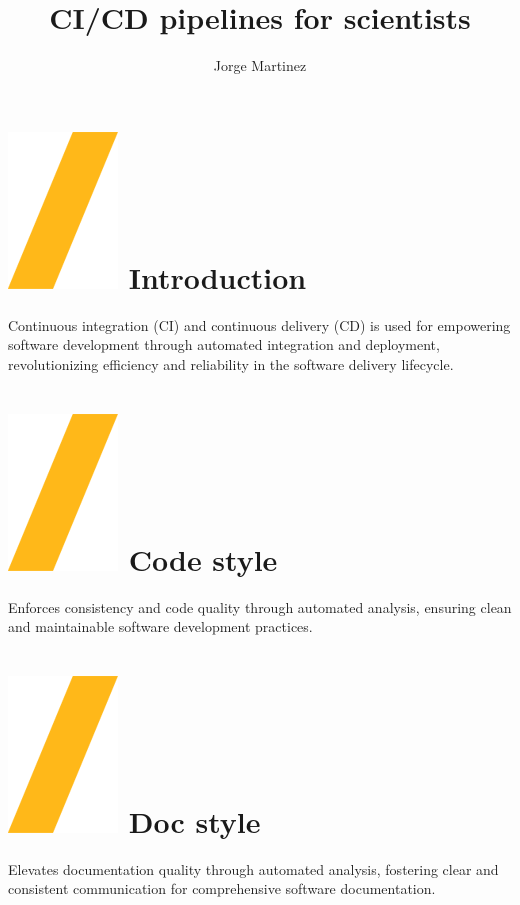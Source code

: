 \documentclass[a0paper,fleqn]{src/betterposter}
\begin{document}
{{}

}{

\title{CI\slash CD pipelines for scientists}
\author{Jorge Martinez}

\section{\includegraphics[height=\fontcharht\font`\S]{img/general/slash.png} Introduction}
Continuous integration (CI) and continuous delivery (CD) is used for empowering
software development through automated integration and deployment,
revolutionizing efficiency and reliability in the software delivery lifecycle.

\section{\includegraphics[height=\fontcharht\font`\S]{img/general/slash.png} Code style}
Enforces consistency and code quality through automated analysis, ensuring
clean and maintainable software development practices.

\section{\includegraphics[height=\fontcharht\font`\S]{img/general/slash.png} Doc style}
Elevates documentation quality through automated analysis, fostering clear and
consistent communication for comprehensive software documentation.

}
\end{document}
